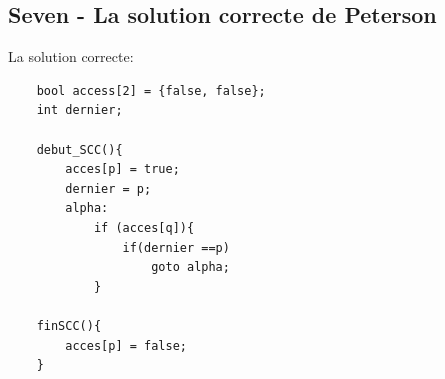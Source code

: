 \documentclass[11pt]{article}
\begin{document}
\pagebreak

\subsection{Seven - La solution correcte de Peterson}
La solution correcte:
\begin{verbatim}
	bool access[2] = {false, false};
	int dernier;

	debut_SCC(){
		acces[p] = true;
		dernier = p;
		alpha:
			if (acces[q]){
				if(dernier ==p)
					goto alpha;
			}

	finSCC(){
		acces[p] = false;
	}

\end{verbatim}
\end{document}
